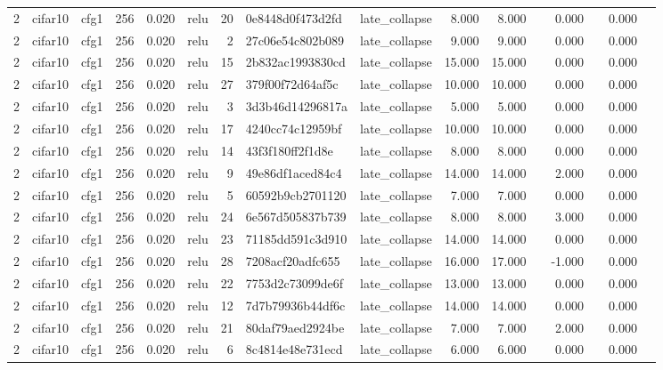 \begin{table}[htbp]
{\begin{tabular}{@{}rllrrlrllrrrrrrr@{}}
2 & cifar10 & cfg1 & 256 & 0.020 & relu & 20 & 0e8448d0f473d2fd & late\_collapse & 8.000 & 8.000 &  & 0.000 &  & 0.000 &  \\
2 & cifar10 & cfg1 & 256 & 0.020 & relu & 2 & 27c06e54c802b089 & late\_collapse & 9.000 & 9.000 &  & 0.000 &  & 0.000 &  \\
2 & cifar10 & cfg1 & 256 & 0.020 & relu & 15 & 2b832ac1993830cd & late\_collapse & 15.000 & 15.000 &  & 0.000 &  & 0.000 &  \\
2 & cifar10 & cfg1 & 256 & 0.020 & relu & 27 & 379f00f72d64af5c & late\_collapse & 10.000 & 10.000 &  & 0.000 &  & 0.000 &  \\
2 & cifar10 & cfg1 & 256 & 0.020 & relu & 3 & 3d3b46d14296817a & late\_collapse & 5.000 & 5.000 &  & 0.000 &  & 0.000 &  \\
2 & cifar10 & cfg1 & 256 & 0.020 & relu & 17 & 4240cc74c12959bf & late\_collapse & 10.000 & 10.000 &  & 0.000 &  & 0.000 &  \\
2 & cifar10 & cfg1 & 256 & 0.020 & relu & 14 & 43f3f180ff2f1d8e & late\_collapse & 8.000 & 8.000 &  & 0.000 &  & 0.000 &  \\
2 & cifar10 & cfg1 & 256 & 0.020 & relu & 9 & 49e86df1aced84c4 & late\_collapse & 14.000 & 14.000 &  & 2.000 &  & 0.000 &  \\
2 & cifar10 & cfg1 & 256 & 0.020 & relu & 5 & 60592b9cb2701120 & late\_collapse & 7.000 & 7.000 &  & 0.000 &  & 0.000 &  \\
2 & cifar10 & cfg1 & 256 & 0.020 & relu & 24 & 6e567d505837b739 & late\_collapse & 8.000 & 8.000 &  & 3.000 &  & 0.000 &  \\
2 & cifar10 & cfg1 & 256 & 0.020 & relu & 23 & 71185dd591c3d910 & late\_collapse & 14.000 & 14.000 &  & 0.000 &  & 0.000 &  \\
2 & cifar10 & cfg1 & 256 & 0.020 & relu & 28 & 7208acf20adfc655 & late\_collapse & 16.000 & 17.000 &  & -1.000 &  & 0.000 &  \\
2 & cifar10 & cfg1 & 256 & 0.020 & relu & 22 & 7753d2c73099de6f & late\_collapse & 13.000 & 13.000 &  & 0.000 &  & 0.000 &  \\
2 & cifar10 & cfg1 & 256 & 0.020 & relu & 12 & 7d7b79936b44df6c & late\_collapse & 14.000 & 14.000 &  & 0.000 &  & 0.000 &  \\
2 & cifar10 & cfg1 & 256 & 0.020 & relu & 21 & 80daf79aed2924be & late\_collapse & 7.000 & 7.000 &  & 2.000 &  & 0.000 &  \\
2 & cifar10 & cfg1 & 256 & 0.020 & relu & 6 & 8c4814e48e731ecd & late\_collapse & 6.000 & 6.000 &  & 0.000 &  & 0.000 &  \\

\end{tabular}}
\end{table}
